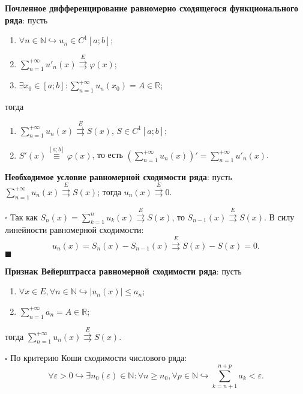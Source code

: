 \documentclass[12pt, a4paper, reqno]{article}
\begin{document}
    \textbf{Почленное дифференцирование равномерно сходящегося функционального ряда}: пусть
    \begin{enumerate}
        \item $\forall n \in \mathbb{N} \hookrightarrow u_n \in C^1[a; b]$;
        \item $\sum\limits_{n = 1}^{+\infty} u'_n(x) \overset{E}{\rightrightarrows} \varphi(x)$;
        \item $\exists x_0 \in [a; b]: \sum\limits_{n = 1}^{+\infty} u_n(x_0) = A \in \mathbb{R}$;
    \end{enumerate}
    тогда
    \begin{enumerate}
        \item $\sum\limits_{n = 1}^{+\infty} u_n(x) \overset{E}{\rightrightarrows} S(x)$,
              $S \in C^1[a; b]$;
        \item $S'(x) \overset{[a; b]}{\equiv} \varphi(x)$, то есть
              $\left(\sum\limits_{n = 1}^{+\infty} u_n(x)\right)' = \sum\limits_{n = 1}^{+\infty} u'_n(x)$.
    \end{enumerate}

    \textbf{Необходимое условие равномерной сходимости ряда}: пусть
    $\sum\limits_{n = 1}^{+\infty} u_n(x) \overset{E}{\rightrightarrows} S(x)$; тогда
    $u_n(x) \overset{E}{\rightrightarrows} 0$.

    $\square$
    Так как $S_n(x) = \sum\limits_{k = 1}^{n} u_k(x) \overset{E}{\rightrightarrows} S(x)$, то
    $S_{n - 1}(x) \overset{E}{\rightrightarrows} S (x)$. В силу линейности равномерной сходимости:
    \begin{equation*}
        u_n(x) = S_n(x) - S_{n - 1}(x) \overset{E}{\rightrightarrows} S(x) - S(x) = 0.
    \end{equation*}
    $\blacksquare$

    \textbf{Признак Вейерштрасса равномерной сходимости ряда}: пусть
    \begin{enumerate}
        \item $\forall x \in E, \forall n \in \mathbb{N} \hookrightarrow |u_n(x)| \leq a_n$;
        \item $\sum\limits_{n = 1}^{+\infty} a_n = A \in \mathbb{R}$;
    \end{enumerate}
    тогда $\sum\limits_{n = 1}^{+\infty} u_n(x) \overset{E}{\rightrightarrows} S(x)$.

    $\square$
    По критерию Коши сходимости числового ряда:
    \begin{equation*}
        \forall \varepsilon > 0 \hookrightarrow \exists n_0(\varepsilon) \in \mathbb{N}:
        \forall n \geq n_0, \forall p \in \mathbb{N} \hookrightarrow
        \sum\limits_{k = n + 1}^{n + p} a_k < \varepsilon.
    \end{equation*}
\end{document}
